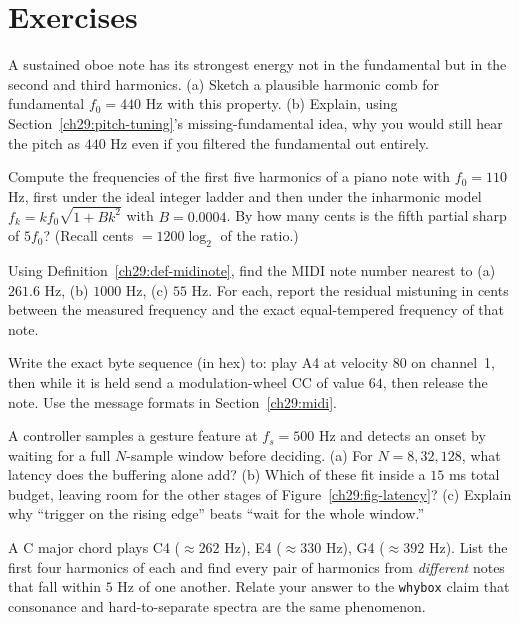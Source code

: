 \section{Exercises}
\label{ch29:exercises}

\begin{exercise}
A sustained oboe note has its strongest energy not in the fundamental but in the second and third
harmonics. (a) Sketch a plausible harmonic comb for fundamental $f_0 = 440$ Hz with this property.
(b) Explain, using Section~\ref{ch29:pitch-tuning}'s missing-fundamental idea, why you would still
hear the pitch as $440$ Hz even if you filtered the fundamental out entirely.
\end{exercise}

\begin{exercise}
Compute the frequencies of the first five harmonics of a piano note with $f_0 = 110$ Hz, first under
the ideal integer ladder and then under the inharmonic model $f_k = k f_0\sqrt{1 + B k^2}$ with $B =
0.0004$. By how many cents is the fifth partial sharp of $5 f_0$? (Recall cents $= 1200\log_2$ of the
ratio.)
\end{exercise}

\begin{exercise}
Using Definition~\ref{ch29:def-midinote}, find the MIDI note number nearest to (a) $261.6$ Hz, (b)
$1000$ Hz, (c) $55$ Hz. For each, report the residual mistuning in cents between the measured frequency
and the exact equal-tempered frequency of that note.
\end{exercise}

\begin{exercise}
Write the exact byte sequence (in hex) to: play A4 at velocity $80$ on channel~1, then while it is
held send a modulation-wheel CC of value $64$, then release the note. Use the message formats in
Section~\ref{ch29:midi}.
\end{exercise}

\begin{exercise}
A controller samples a gesture feature at $f_s = 500$ Hz and detects an onset by waiting for a full
$N$-sample window before deciding. (a) For $N = 8, 32, 128$, what latency does the buffering alone add?
(b) Which of these fit inside a $15$ ms total budget, leaving room for the other stages of
Figure~\ref{ch29:fig-latency}? (c) Explain why ``trigger on the rising edge'' beats ``wait for the
whole window.''
\end{exercise}

\begin{exercise}
A C major chord plays C4 ($\approx 262$ Hz), E4 ($\approx 330$ Hz), G4 ($\approx 392$ Hz). List the
first four harmonics of each and find every pair of harmonics from \emph{different} notes that fall
within $5$ Hz of one another. Relate your answer to the \texttt{whybox} claim that consonance and
hard-to-separate spectra are the same phenomenon.
\end{exercise}

